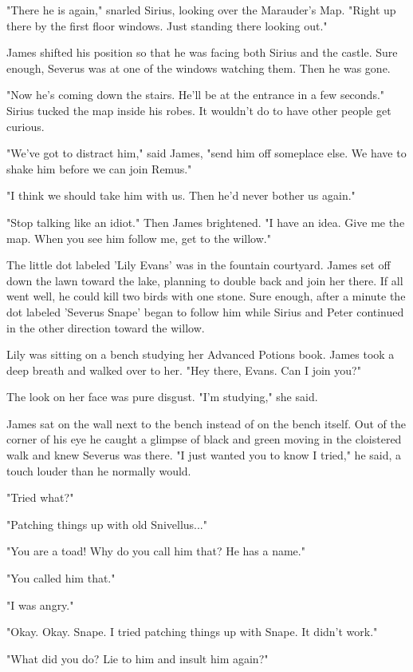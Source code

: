 \documentclass[a4paper,11pt]{article}
\begin{document}
"There he is again," snarled Sirius, looking over the Marauder's Map. "Right up there by the first floor windows. Just standing there looking out."

James shifted his position so that he was facing both Sirius and the castle. Sure enough, Severus was at one of the windows watching them. Then he was gone.

"Now he's coming down the stairs. He'll be at the entrance in a few seconds." Sirius tucked the map inside his robes. It wouldn't do to have other people get curious.

"We've got to distract him," said James, "send him off someplace else. We have to shake him before we can join Remus."

"I think we should take him with us. Then he'd never bother us again."

"Stop talking like an idiot." Then James brightened. "I have an idea. Give me the map. When you see him follow me, get to the willow."

The little dot labeled 'Lily Evans' was in the fountain courtyard. James set off down the lawn toward the lake, planning to double back and join her there. If all went well, he could kill two birds with one stone. Sure enough, after a minute the dot labeled 'Severus Snape' began to follow him while Sirius and Peter continued in the other direction toward the willow.

Lily was sitting on a bench studying her Advanced Potions book. James took a deep breath and walked over to her. "Hey there, Evans. Can I join you?"

The look on her face was pure disgust. "I'm studying," she said.

James sat on the wall next to the bench instead of on the bench itself. Out of the corner of his eye he caught a glimpse of black and green moving in the cloistered walk and knew Severus was there. "I just wanted you to know I tried," he said, a touch louder than he normally would.

"Tried what?"

"Patching things up with old Snivellus..."

"You are a toad! Why do you call him that? He has a name."

"You called him that."

"I was angry."

"Okay. Okay. Snape. I tried patching things up with Snape. It didn't work."

"What did you do? Lie to him and insult him again?"
\end{document}
